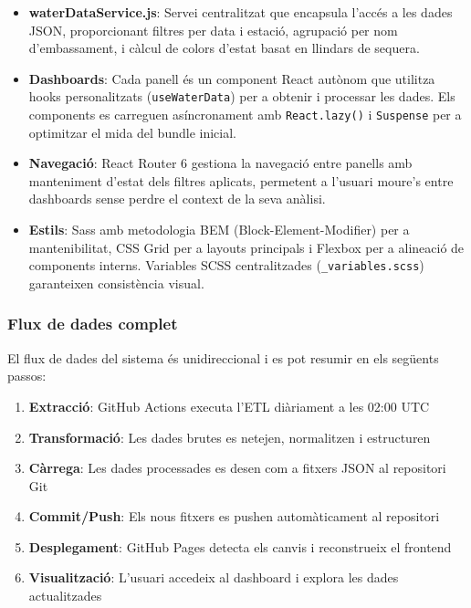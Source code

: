 \begin{itemize}
    \item \textbf{waterDataService.js}: Servei centralitzat que encapsula l'accés a les dades JSON, proporcionant filtres per data i estació, agrupació per nom d'embassament, i càlcul de colors d'estat basat en llindars de sequera.
    
    \item \textbf{Dashboards}: Cada panell és un component React autònom que utilitza hooks personalitzats (\texttt{useWaterData}) per a obtenir i processar les dades. Els components es carreguen asíncronament amb \texttt{React.lazy()} i \texttt{Suspense} per a optimitzar el mida del bundle inicial.
    
    \item \textbf{Navegació}: React Router 6 gestiona la navegació entre panells amb manteniment d'estat dels filtres aplicats, permetent a l'usuari moure's entre dashboards sense perdre el context de la seva anàlisi.
    
    \item \textbf{Estils}: Sass amb metodologia BEM (Block-Element-Modifier) per a mantenibilitat, CSS Grid per a layouts principals i Flexbox per a alineació de components interns. Variables SCSS centralitzades (\texttt{\_variables.scss}) garanteixen consistència visual.
\end{itemize}

\subsubsection{Flux de dades complet}

El flux de dades del sistema és unidireccional i es pot resumir en els següents passos:

\begin{enumerate}
    \item \textbf{Extracció}: GitHub Actions executa l'ETL diàriament a les 02:00 UTC
    \item \textbf{Transformació}: Les dades brutes es netejen, normalitzen i estructuren
    \item \textbf{Càrrega}: Les dades processades es desen com a fitxers JSON al repositori Git
    \item \textbf{Commit/Push}: Els nous fitxers es pushen automàticament al repositori
    \item \textbf{Desplegament}: GitHub Pages detecta els canvis i reconstrueix el frontend
    \item \textbf{Visualització}: L'usuari accedeix al dashboard i explora les dades actualitzades
\end{enumerate}

